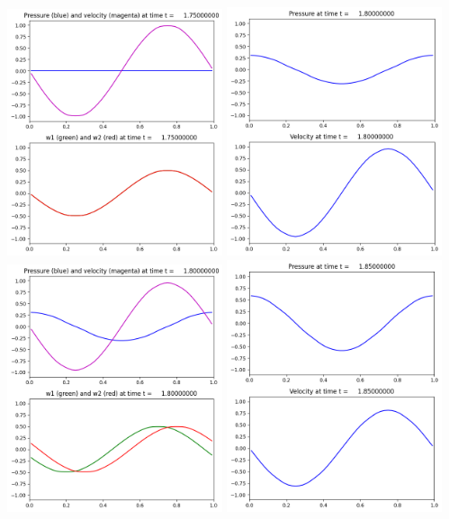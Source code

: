 \documentclass[11pt]{article}
\begin{document}
\includegraphics[width=0.475\textwidth]{frame0035fig2.png}
\vskip 10pt 
\includegraphics[width=0.475\textwidth]{frame0036fig1.png}
\includegraphics[width=0.475\textwidth]{frame0036fig2.png}
\vskip 10pt 
\includegraphics[width=0.475\textwidth]{frame0037fig1.png}
\end{document}
